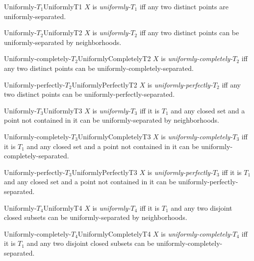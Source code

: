 \begin{dfn}{Uniformly-$T_1$}{UniformlyT1}
$X$ is \emph{uniformly-$T_1$} iff any two distinct points are uniformly-separated.
\end{dfn}
\begin{dfn}{Uniformly-$T_2$}{UniformlyT2}
$X$ is \emph{uniformly-$T_2$} iff any two distinct points can be uniformly-separated by neighborhoods.
\end{dfn}
\begin{dfn}{Uniformly-completely-$T_2$\hfill}{UniformlyCompletelyT2}
$X$ is \emph{uniformly-completely-$T_2$} iff any two distinct points can be uniformly-completely-separated.
\end{dfn}
\begin{dfn}{Uniformly-perfectly-$T_2$\hfill}{UniformlyPerfectlyT2}
$X$ is \emph{uniformly-perfectly-$T_2$} iff any two distinct points can be uniformly-perfectly-separated.
\end{dfn}
\begin{dfn}{Uniformly-$T_3$}{UniformlyT3}
$X$ is \emph{uniformly-$T_3$} iff it is $T_1$ and any closed set and a point not contained in it can be uniformly-separated by neighborhoods.
\end{dfn}
\begin{dfn}{Uniformly-completely-$T_3$\hfill}{UniformlyCompletelyT3}
$X$ is \emph{uniformly-completely-$T_3$} iff it is $T_1$ and any closed set and a point not contained in it can be uniformly-completely-separated.
\end{dfn}
\begin{dfn}{Uniformly-perfectly-$T_3$\hfill}{UniformlyPerfectlyT3}
$X$ is \emph{uniformly-perfectly-$T_3$} iff it is $T_1$ and any closed set and a point not contained in it can be uniformly-perfectly-separated.
\end{dfn}
\begin{dfn}{Uniformly-$T_4$}{UniformlyT4}
$X$ is \emph{uniformly-$T_4$} iff it is $T_1$ and any two disjoint closed subsets can be uniformly-separated by neighborhoods.
\end{dfn}
\begin{dfn}{Uniformly-completely-$T_4$\hfill}{UniformlyCompletelyT4}
$X$ is \emph{uniformly-completely-$T_4$} iff it is $T_1$ and any two disjoint closed subsets can be uniformly-completely-separated.
\end{dfn}
